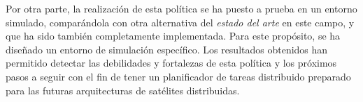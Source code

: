 \documentclass[
10pt, %
english, %
singlespacing, %
parskip, %
headsepline, %
]{MastersDoctoralThesis} %
\begin{document}
\begin{abstractes}
Por otra parte, la realización de esta política se ha puesto a prueba en un entorno simulado, comparándola con otra alternativa del \emph{estado del arte} en este campo, y que ha sido también completamente implementada. Para este propósito, se ha diseñado un entorno de simulación específico. Los resultados obtenidos han permitido detectar las debilidades y fortalezas de esta política y los próximos pasos a seguir con el fin de tener un planificador de tareas distribuido preparado para las futuras arquitecturas de satélites distribuidas.

\end{abstractes}

\end{document}
